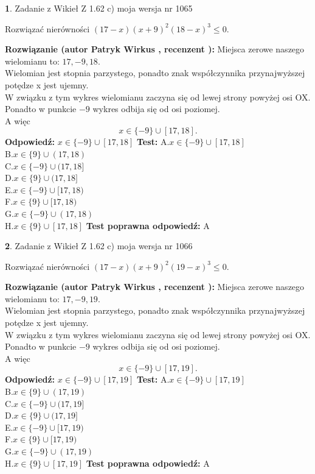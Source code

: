 \documentclass[12pt, a4paper]{article}
\theoremstyle{definition} %
\newtheorem{zad}{}
\newcommand{\zadStart}[1]{\begin{zad}#1\newline}
\newcommand{\zadStop}{\end{zad}}
\newcommand{\rozwStart}[2]{\noindent \textbf{Rozwiązanie (autor #1 , recenzent #2): }\newline}
\newcommand{\rozwStop}{\newline}
\newcommand{\odpStart}{\noindent \textbf{Odpowiedź:}\newline}
\newcommand{\odpStop}{\newline}
\newcommand{\testStart}{\noindent \textbf{Test:}\newline}
\newcommand{\testStop}{\newline}
\newcommand{\kluczStart}{\noindent \textbf{Test poprawna odpowiedź:}\newline}
\newcommand{\kluczStop}{\newline}
\begin{document}
\zadStart{Zadanie z Wikieł Z 1.62 c) moja wersja nr 1065}

Rozwiązać nierówności $(17-x)(x+9)^{2}(18-x)^{3}\le0$.
\zadStop
\rozwStart{Patryk Wirkus}{}
Miejsca zerowe naszego wielomianu to: $17, -9, 18$.\\
Wielomian jest stopnia parzystego, ponadto znak współczynnika przy\linebreak najwyższej potędze x jest ujemny.\\ W związku z tym wykres wielomianu zaczyna się od lewej strony powyżej osi OX.\\
Ponadto w punkcie $-9$ wykres odbija się od osi poziomej.\\
A więc $$x \in \{-9\} \cup [17,18].$$
\rozwStop
\odpStart
$x \in \{-9\} \cup [17,18]$
\odpStop
\testStart
A.$x \in \{-9\} \cup [17,18]$\\
B.$x \in \{9\} \cup (17,18)$\\
C.$x \in \{-9\} \cup (17,18]$\\
D.$x \in \{9\} \cup (17,18]$\\
E.$x \in \{-9\} \cup [17,18)$\\
F.$x \in \{9\} \cup [17,18)$\\
G.$x \in \{-9\} \cup (17,18)$\\
H.$x \in \{9\} \cup [17,18]$
\testStop
\kluczStart
A
\kluczStop



\zadStart{Zadanie z Wikieł Z 1.62 c) moja wersja nr 1066}

Rozwiązać nierówności $(17-x)(x+9)^{2}(19-x)^{3}\le0$.
\zadStop
\rozwStart{Patryk Wirkus}{}
Miejsca zerowe naszego wielomianu to: $17, -9, 19$.\\
Wielomian jest stopnia parzystego, ponadto znak współczynnika przy\linebreak najwyższej potędze x jest ujemny.\\ W związku z tym wykres wielomianu zaczyna się od lewej strony powyżej osi OX.\\
Ponadto w punkcie $-9$ wykres odbija się od osi poziomej.\\
A więc $$x \in \{-9\} \cup [17,19].$$
\rozwStop
\odpStart
$x \in \{-9\} \cup [17,19]$
\odpStop
\testStart
A.$x \in \{-9\} \cup [17,19]$\\
B.$x \in \{9\} \cup (17,19)$\\
C.$x \in \{-9\} \cup (17,19]$\\
D.$x \in \{9\} \cup (17,19]$\\
E.$x \in \{-9\} \cup [17,19)$\\
F.$x \in \{9\} \cup [17,19)$\\
G.$x \in \{-9\} \cup (17,19)$\\
H.$x \in \{9\} \cup [17,19]$
\testStop
\kluczStart
A
\kluczStop
\end{document}

